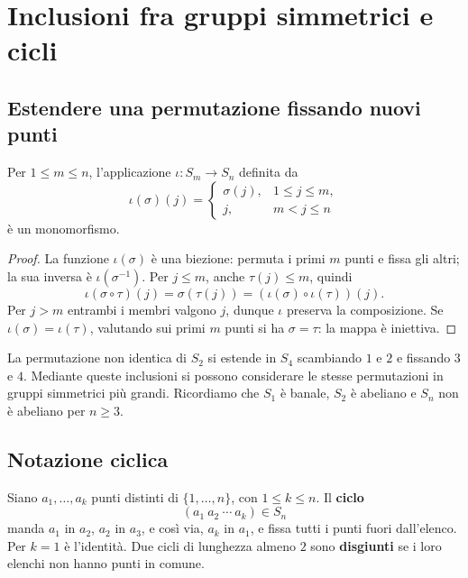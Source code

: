 \section{Inclusioni fra gruppi simmetrici e cicli}
\subsection{Estendere una permutazione fissando nuovi punti}
\begin{proposizione}\label{prop:inclusione-simmetrici}
Per $1\le m\le n$, l'applicazione $\iota:S_m\to S_n$ definita da
\[
\iota(\sigma)(j)=
\begin{cases}
\sigma(j),&1\le j\le m,\\
j,&m<j\le n
\end{cases}
\]
è un monomorfismo.
\end{proposizione}
\begin{proof}
La funzione $\iota(\sigma)$ è una biezione: permuta i primi $m$ punti e fissa gli altri; la sua inversa è $\iota(\sigma^{-1})$. Per $j\le m$, anche $\tau(j)\le m$, quindi
\[
\iota(\sigma\circ\tau)(j)=\sigma(\tau(j))
=(\iota(\sigma)\circ\iota(\tau))(j).
\]
Per $j>m$ entrambi i membri valgono $j$, dunque $\iota$ preserva la composizione. Se $\iota(\sigma)=\iota(\tau)$, valutando sui primi $m$ punti si ha $\sigma=\tau$: la mappa è iniettiva.
\end{proof}

\begin{esempio}
La permutazione non identica di $S_2$ si estende in $S_4$ scambiando $1$ e $2$ e fissando $3$ e $4$. Mediante queste inclusioni si possono considerare le stesse permutazioni in gruppi simmetrici più grandi. Ricordiamo che $S_1$ è banale, $S_2$ è abeliano e $S_n$ non è abeliano per $n\ge3$.
\end{esempio}

\subsection{Notazione ciclica}
\begin{definizione}
Siano $a_1,\ldots,a_k$ punti distinti di $\{1,\ldots,n\}$, con $1\le k\le n$. Il \textbf{ciclo}
\[
(a_1\ a_2\ \cdots\ a_k)\in S_n
\]
manda $a_1$ in $a_2$, $a_2$ in $a_3$, e così via, $a_k$ in $a_1$, e fissa tutti i punti fuori dall'elenco. Per $k=1$ è l'identità. Due cicli di lunghezza almeno $2$ sono \textbf{disgiunti} se i loro elenchi non hanno punti in comune.
\end{definizione}

